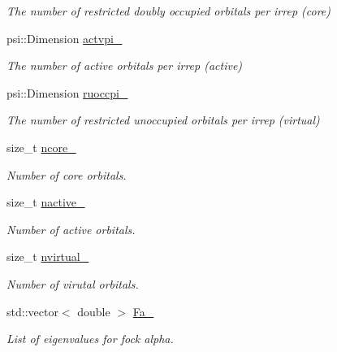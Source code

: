 \begin{DoxyCompactItemize}
\begin{DoxyCompactList}\small\item\em The number of restricted doubly occupied orbitals per irrep (core) \end{DoxyCompactList}\item 
psi\+::\+Dimension \mbox{\hyperlink{classforte_1_1_t_h_r_e_e___d_s_r_g___m_r_p_t2_a5ff9749896eba50ed184a08576533d24}{actvpi\+\_\+}}
\begin{DoxyCompactList}\small\item\em The number of active orbitals per irrep (active) \end{DoxyCompactList}\item 
psi\+::\+Dimension \mbox{\hyperlink{classforte_1_1_t_h_r_e_e___d_s_r_g___m_r_p_t2_a373ae3db84c4bd3e2400b91ed6911862}{ruoccpi\+\_\+}}
\begin{DoxyCompactList}\small\item\em The number of restricted unoccupied orbitals per irrep (virtual) \end{DoxyCompactList}\item 
size\+\_\+t \mbox{\hyperlink{classforte_1_1_t_h_r_e_e___d_s_r_g___m_r_p_t2_ad09ca9c6fd85fdcf251df0fb4eac7d32}{ncore\+\_\+}}
\begin{DoxyCompactList}\small\item\em Number of core orbitals. \end{DoxyCompactList}\item 
size\+\_\+t \mbox{\hyperlink{classforte_1_1_t_h_r_e_e___d_s_r_g___m_r_p_t2_afb9c82a9aa088a9777a2f3f1b5f62c3e}{nactive\+\_\+}}
\begin{DoxyCompactList}\small\item\em Number of active orbitals. \end{DoxyCompactList}\item 
size\+\_\+t \mbox{\hyperlink{classforte_1_1_t_h_r_e_e___d_s_r_g___m_r_p_t2_a4b2f06ffe6b7ff8bd2d95e805b8c510a}{nvirtual\+\_\+}}
\begin{DoxyCompactList}\small\item\em Number of virutal orbitals. \end{DoxyCompactList}\item 
std\+::vector$<$ double $>$ \mbox{\hyperlink{classforte_1_1_t_h_r_e_e___d_s_r_g___m_r_p_t2_affdfb359e2c2c63416f29df62d246910}{Fa\+\_\+}}
\begin{DoxyCompactList}\small\item\em List of eigenvalues for fock alpha. \end{DoxyCompactList}\item 

\end{DoxyCompactItemize}
